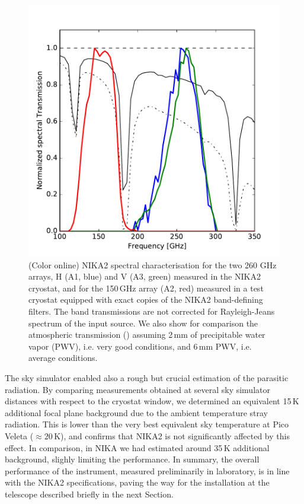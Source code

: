 \documentclass[]{aa} %
\begin{document}
\begin{figure}[h]
   \centering
    \includegraphics[width=1.0\linewidth]{atm_transmission.pdf}
      \caption{(Color online) NIKA2 spectral characterisation for the two 260 GHz arrays, H (A1, blue) and V (A3, green) measured in the NIKA2 cryostat, and for the 150\,GHz array (A2, red) measured in a test cryostat equipped with exact copies of the NIKA2 band-defining filters. The band transmissions are not corrected for Rayleigh-Jeans spectrum of the input source. We also show for comparison the atmospheric transmission (\cite{Pardo2002}) assuming 2\,mm of precipitable water vapor (PWV), i.e. very good conditions, and 6\,mm PWV, i.e. average conditions.
         \label{Fig4}}
\end{figure}

The sky simulator enabled also a rough but crucial estimation of the parasitic radiation. By comparing measurements obtained at several sky simulator distances with respect to the cryostat window, we determined an equivalent 15\,K additional focal plane background due to the ambient temperature stray radiation. This is lower than the very best equivalent sky temperature at Pico Veleta ($\approx 20\,\textrm{K}$), and confirms that NIKA2 is not significantly affected by this effect. In comparison, in NIKA we had estimated around 35\,K additional background, slighly limiting the performance. 
In summary, the overall performance of the instrument, measured preliminarily in laboratory, is in line with the NIKA2 specifications, paving the way for the installation at the telescope described briefly in the next Section. 
\end{document}
